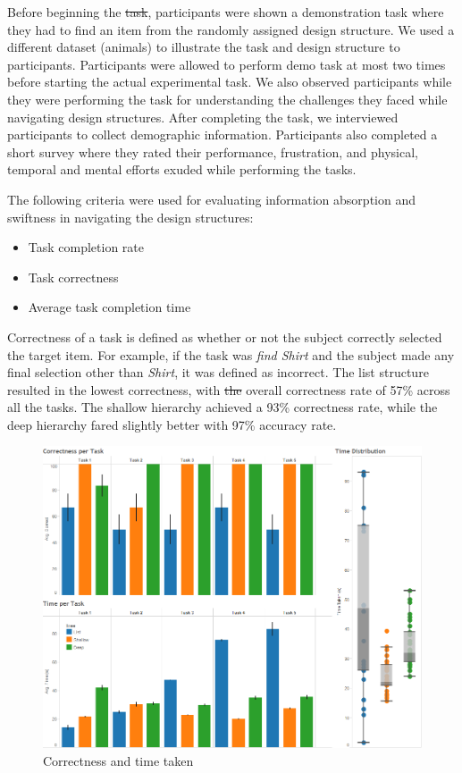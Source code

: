 \documentclass{sigchi}
\providecommand{\DIFaddtex}[1]{{\protect\color{blue}\uwave{#1}}} %
\providecommand{\DIFdeltex}[1]{{\protect\color{red}\sout{#1}}}                      %
\providecommand{\DIFaddbegin}{} %
\providecommand{\DIFaddend}{} %
\providecommand{\DIFdelbegin}{} %
\providecommand{\DIFdelend}{} %
\providecommand{\DIFadd}[1]{\texorpdfstring{\DIFaddtex{#1}}{#1}} %
\providecommand{\DIFdel}[1]{\texorpdfstring{\DIFdeltex{#1}}{}} %
\begin{document}
Before beginning the \DIFdelbegin \DIFdel{task}\DIFdelend \DIFaddbegin \DIFadd{experiment}\DIFaddend , participants were shown a demonstration task where they had to find an item from the randomly assigned design structure. We used a different dataset (animals) to illustrate the task and design structure to participants. Participants were allowed to perform demo task at most two times before starting the actual experimental task. We also observed participants while they were performing the task for understanding the challenges they faced while navigating design structures. After completing the task, we interviewed participants to collect demographic information. Participants also completed a short survey where they rated their performance, frustration, and physical, temporal and mental efforts exuded while performing the tasks. 

The following criteria were used for evaluating information absorption and swiftness in navigating the design structures:
\begin{itemize}
\item Task completion rate
\item Task correctness
\item Average task completion time
\end{itemize}

Correctness of a task is defined as whether or not the subject correctly selected the target item. For example, if the task was \textit{find Shirt} and the subject made any final selection other than \textit{Shirt}, it was defined as incorrect. The list structure resulted in the lowest correctness, with \DIFdelbegin \DIFdel{the }\DIFdelend \DIFaddbegin \DIFadd{an }\DIFaddend overall correctness rate of 57\% across all the tasks. The shallow hierarchy achieved a 93\% correctness rate, while the deep hierarchy fared slightly better with 97\% accuracy rate.

\begin{figure}[!h]
    \centering
    \includegraphics[width=0.9\columnwidth]{fig_CorrectnessAndTime}
    \caption{Correctness and time taken}
    \label{fig: Figure3}
\end{figure}
\end{document}
